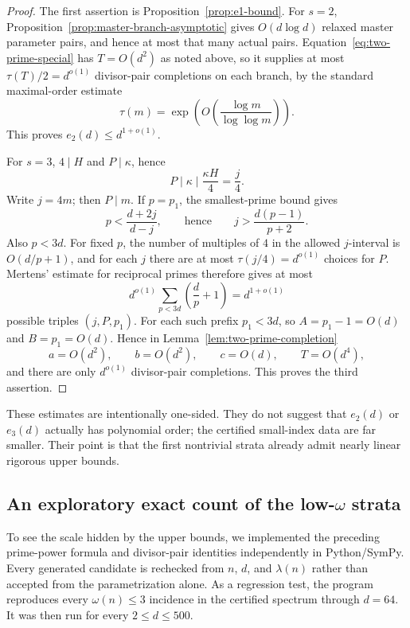 \documentclass[11pt]{article}
\begin{document}
\begin{proof}
The first assertion is Proposition~\ref{prop:e1-bound}.  For $s=2$,
Proposition~\ref{prop:master-branch-asymptotic} gives $O(d\log d)$ relaxed master
parameter pairs, and hence at most that many actual pairs.  Equation~\eqref{eq:two-prime-special} has $T=O(d^2)$ as noted above, so it
supplies at most $\tau(T)/2=d^{o(1)}$ divisor-pair completions on each branch,
by the standard maximal-order estimate
\[
\tau(m)=\exp\!\left(O\!\left(\frac{\log m}{\log\log m}\right)\right).
\]
This proves $e_2(d)\le d^{1+o(1)}$.

For $s=3$, $4\mid H$ and $P\mid\kappa$, hence
\[
P\mid\kappa\mid\frac{\kappa H}{4}=\frac j4.
\]
Write $j=4m$; then $P\mid m$.  If $p=p_1$, the smallest-prime bound gives
\[
p<\frac{d+2j}{d-j},
\qquad\text{hence}\qquad
j>\frac{d(p-1)}{p+2}.
\]
Also $p<3d$.  For fixed $p$, the number of multiples of $4$ in the allowed
$j$-interval is $O(d/p+1)$, and for each $j$ there are at most
$\tau(j/4)=d^{o(1)}$ choices for $P$.  Mertens' estimate for reciprocal
primes therefore gives at most
\[
d^{o(1)}\sum_{p<3d}\left(\frac d p+1\right)=d^{1+o(1)}
\]
possible triples $(j,P,p_1)$.  For each such prefix $p_1<3d$, so
$A=p_1-1=O(d)$ and $B=p_1=O(d)$.  Hence in
Lemma~\ref{lem:two-prime-completion}
\[
a=O(d^2),\qquad b=O(d^2),\qquad c=O(d),\qquad T=O(d^4),
\]
and there are only $d^{o(1)}$ divisor-pair completions.  This proves the third
assertion.
\end{proof}

These estimates are intentionally one-sided.  They do not suggest that
$e_2(d)$ or $e_3(d)$ actually has polynomial order; the certified small-index
data are far smaller.  Their point is that the first nontrivial strata already
admit nearly linear rigorous upper bounds.

\subsection{An exploratory exact count of the low-$\omega$ strata}
\label{subsec:low-omega-experiment}

To see the scale hidden by the upper bounds, we implemented the preceding
prime-power formula and divisor-pair identities independently in Python/SymPy.
Every generated candidate is rechecked from $n$, $d$, and $\lambda(n)$ rather
than accepted from the parametrization alone.  As a regression test, the
program reproduces every $\omega(n)\le3$ incidence in the certified spectrum through $d=64$.  It was then run for every $2\le d\le500$.
\end{document}
